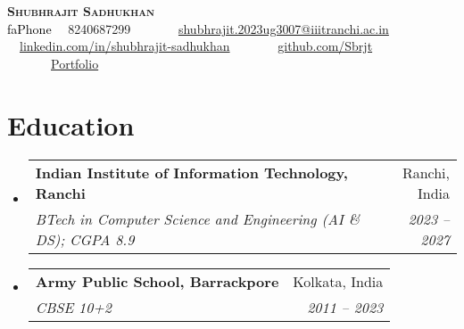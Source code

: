 \documentclass[letterpaper,11pt]{article}
\makeatletter
\newcommand{\resumeSubheading}[4]{
  \vspace{-2pt}\item
    \begin{tabular*}{0.97\textwidth}[t]{l@{\extracolsep{\fill}}r}
      \textbf{#1} & #2 \\
      \textit{\small#3} & \textit{\small #4} \\
    \end{tabular*}\vspace{-7pt}
}
\newcommand{\resumeSubHeadingListStart}{\begin{itemize}[leftmargin=0.15in, label={}]}
\newcommand{\resumeSubHeadingListEnd}{\end{itemize}}
\newcommand{\seticon}[1]{\textcolor{Black}{\csname #1\endcsname}}
\makeatother
\begin{document}

\begin{center}
    \textbf{\Huge \scshape Shubhrajit Sadhukhan} \\ \vspace{5pt}
    \small \seticon{faPhone} \ \ 8240687299 \ \ \ \ \ \faEnvelope \ \  \href{mailto:shubhrajit.2023ug3007@iiitranchi.ac.in}{shubhrajit.2023ug3007@iiitranchi.ac.in} \\ 
    \vspace{3pt}
    \faLinkedin \ \ \href{https://linkedin.com/in/shubhrajit-sadhukhan}{linkedin.com/in/shubhrajit-sadhukhan} \ \ \ \ \ 
    \faGithub \ \ \href{https://github.com/Sbrjt}{github.com/Sbrjt} 	\ \ \ \ \ 
    \faLink \ \ \href{https://sbrjt.github.io/}{Portfolio}
\end{center}

\begin{comment}
\begin{minipage}[t]{0.48\textwidth}
    \textbf{\Huge \scshape Shubhrajit \\ Sadhukhan} \\
    
    \href{https://sbrjt.github.io/}{sbrjt.github.io}
\end{minipage}
\hfill
\begin{minipage}[t]{0.48\textwidth}
    \raggedleft
    \small
    \faPhone\ 8240687299 \\
    \faEnvelope \ \href{mailto:shubhrajit.2023ug3007@iiitranchi.ac.in}{shubhrajit.2023ug3007@iiitranchi.ac.in} \\
    \faLinkedin \  \ \href{https://linkedin.com/in/shubhrajit-sadhukhan}{linkedin.com/in/shubhrajit-sadhukhan} \\
    \faGithub \ \href{https://github.com/Sbrjt}{github.com/Sbrjt}
\end{minipage}
\end{comment}

\section{Education}
  \resumeSubHeadingListStart
    \resumeSubheading
      {Indian Institute of Information Technology, Ranchi}{Ranchi, India}
      {BTech in Computer Science and Engineering (AI \& DS); CGPA 8.9}{2023 -- 2027}
    \resumeSubheading
      {Army Public School, Barrackpore}{Kolkata, India}
      {CBSE 10+2}{2011 -- 2023}
  \resumeSubHeadingListEnd
\end{document}
